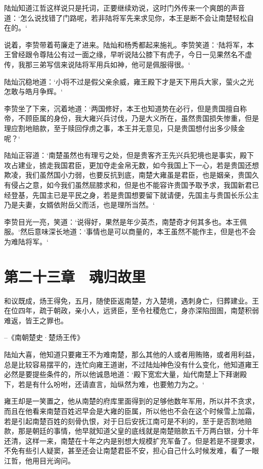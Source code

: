 陆灿知道江哲这样说只是托词，正要继续劝说，这时门外传来一个爽朗的声音道：‘怎么说找错了门路呢，若非陆将军先来求见你，本王是断不会让南楚轻松自在的。‘

说着，李贽带着苟廉走了进来。陆灿和杨秀都起来施礼。李贽笑道：‘陆将军，本王曾经跟令尊陆公有过一面之缘，早听说陆公膝下有虎子，今日一见果然名不虚传，我那三弟写信来说陆将军用兵如神，他可是佩服得很。‘

陆灿沉稳地道：‘小将不过是假父亲余威，雍王殿下才是天下用兵大家，萤火之光怎敢与皓月争辉。‘

李贽坐了下来，沉着地道：‘两国修好，本王也知道势在必行，但是贵国擅自称帝，不顾臣属的身份，我大雍兴兵讨伐，乃是大义所在，虽然贵国损失惨重，但是理应割地赔款，至于赎回俘虏之事，本王并无意见，只是贵国想付出多少赎金呢？‘

陆灿正容道：‘南楚虽然也有理亏之处，但是贵客齐王先兴兵犯境也是事实，殿下攻占建业，掳走我国君臣，更加夺走金帛无数，如今我国上下一心，若是贵国还想欺凌，我们虽然国小力弱，也要反抗到底，南楚大雍虽是君臣，也是姻亲，贵国久有侵占之意，如今我们虽然屈膝求和，但是也不能容许贵国予取予求，我国新君已经登基，先国主已是平民之身，若是贵国想要留下就请便，先国主与贵国长乐公主乃是夫妻，女婿依附岳父而活，也是理所当然。‘

李贽目光一亮，笑道：‘说得好，果然是年少英杰，南楚奇才何其多也。本王佩服。‘然后意味深长地道：‘事情也是可以商量的，本王虽然不能作主，但是也不会为难陆将军。‘

\chapter{第二十三章　魂归故里}

和议既成，炀王得免，五月，随使臣返南楚，方入楚境，遇刺身亡，归葬建业。王在位四年，疏于朝政，亲小人，远贤臣，至令社稷危亡，身亦深陷囹圄，南楚积弱难返，皆王之罪也。

--《南朝楚史·楚炀王传》

陆灿大喜，他知道只要雍王不为难南楚，那么其他的人或者用贿赂，或者用利益，总是比较容易摆平的，连忙向雍王道谢，不过陆灿神色没有什么变化，他知道雍王必然是要提些条件的，所以他诚恳地道：‘殿下宽宏大量，灿代南楚上下拜谢殿下，若是有什么吩咐，还请直言，灿纵然为难，也要勉力为之。‘

雍王却是一笑置之，他从南楚的府库里面得到的足够他数年军用，所以并不贪求，而且在他看来南楚百姓迟早会是大雍的臣属，所以他也不会在这个时候雪上加霜，若是引起南楚百姓的刻骨仇恨，对于日后安抚江南可是不利的，至于是否割地赔款，那是朝廷的事情，他早就知道父皇的底线就是南楚赔款五千万两白银，分十年还清，这样一来，南楚在十年之内是别想大规模扩充军备了。但是若是不提要求，不免有些引人疑窦，甚至还会让南楚君臣不安，担心自己什么时候发难，看了一眼江哲，他用目光询问。

